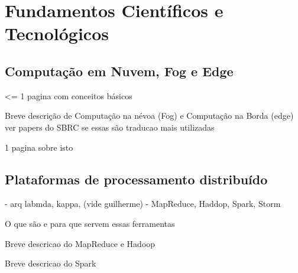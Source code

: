 \chapter{Fundamentos Científicos e Tecnológicos}


\section{Computação em Nuvem, Fog e Edge}

<= 1 pagina com conceitos básicos

Breve descrição de Computação na névoa (Fog) e Computação na Borda (edge) \\
ver papers do SBRC se essas são traducao mais utilizadas

1 pagina sobre isto

\section{Plataformas de processamento distribuído}
- arq labmda, kappa, (vide guilherme)
- MapReduce, Haddop, Spark, Storm


O que são e para que servem essas ferramentas 

Breve descricao do MapReduce e Hadoop

Breve descricao do Spark 



